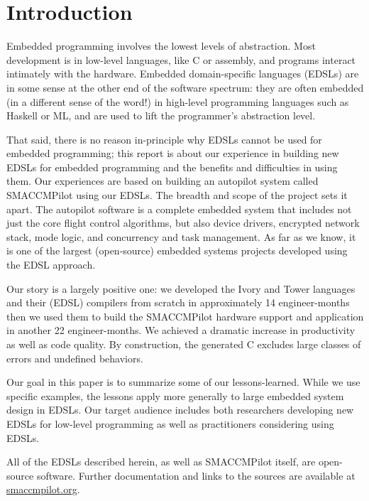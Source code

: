 \section{Introduction}

Embedded programming involves the lowest levels of abstraction.  Most development
is in low-level languages, like C or assembly, and programs interact intimately
with the hardware.  Embedded domain-specific languages (EDSLs) are in
some sense at the other end of the software spectrum: they are often embedded
(in a different sense of the word!) in high-level programming languages such as
Haskell or ML, and are used to lift the programmer's abstraction level.

That said, there is no reason in-principle why EDSLs cannot be used for embedded
programming; this report is about our experience in building new EDSLs for
embedded programming and the benefits and difficulties in using them.  Our
experiences are based on building an autopilot system called SMACCMPilot using
our EDSLs.  The breadth and scope of the project sets it apart.  The autopilot
software is a complete embedded system that
includes not just the core flight control algorithms, but also device drivers,
encrypted network stack, mode logic, and concurrency and task management.
As far as we know, it is
one of the largest (open-source) embedded systems projects developed using the
EDSL approach.

Our story is a largely positive one: we developed the Ivory and Tower languages
and their (EDSL) compilers from scratch in approximately 14 engineer-months then
we used them to build the SMACCMPilot hardware support and application in
another 22 engineer-months.  We achieved a dramatic increase in productivity as
well as code quality.  By construction, the generated C excludes large classes
of errors and undefined behaviors.

Our goal in this paper is to summarize some of our lessons-learned.  While we
use specific examples, the lessons apply more generally to large
embedded system design in EDSLs.  Our target audience includes both researchers
developing new EDSLs for low-level programming as well as practitioners
considering using EDSLs.

All of the EDSLs described herein, as well as SMACCMPilot itself, are
open-source software. Further documentation and links to the sources are
available at \url{smaccmpilot.org}.




